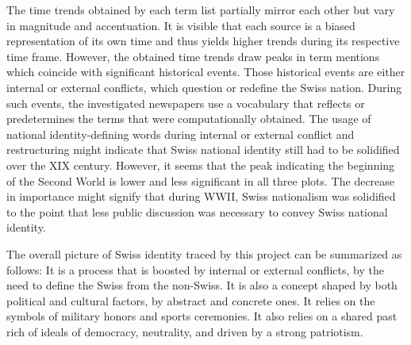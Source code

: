 \documentclass[11pt]{article}
\begin{document}
The time trends obtained by each term list partially mirror each other but vary in magnitude and accentuation. It is visible that each source is a biased representation of its own time and thus yields higher trends during its respective time frame. However, the obtained time trends draw peaks in term mentions which coincide with significant historical events. Those historical events are either internal or external conflicts, which question or redefine the Swiss nation. During such events, the investigated newspapers use a vocabulary that reflects or predetermines the terms that were computationally obtained. 
The usage of national identity-defining words during internal or external conflict and restructuring might indicate that Swiss national identity still had to be solidified over the XIX century. However, it seems that the peak indicating the beginning of the Second World is lower and less significant in all three plots. The decrease in importance might signify that during WWII, Swiss nationalism was solidified to the point that less public discussion was necessary to convey Swiss national identity.

The overall picture of Swiss identity traced by this project can be summarized as follows: It is a process that is boosted by internal or external conflicts, by the need to define the Swiss from the non-Swiss. It is also a concept shaped by both political and cultural factors, by abstract and concrete ones. It relies on the symbols of military honors and sports ceremonies. It also relies on a shared past rich of ideals of democracy, neutrality, and driven by a strong patriotism.
\end{document}
